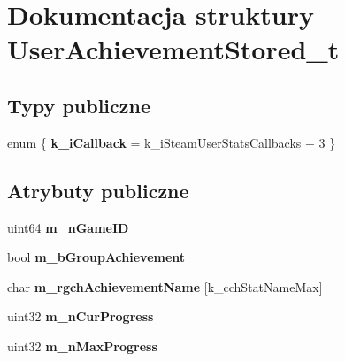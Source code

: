 \hypertarget{struct_user_achievement_stored__t}{}\section{Dokumentacja struktury User\+Achievement\+Stored\+\_\+t}
\label{struct_user_achievement_stored__t}
\subsection*{Typy publiczne}
\begin{DoxyCompactItemize}
\item 
\mbox{\label{struct_user_achievement_stored__t_a65743d3117422d2445c2b53546133399}} 
enum \{ {\bfseries k\+\_\+i\+Callback} = k\+\_\+i\+Steam\+User\+Stats\+Callbacks + 3
 \}
\end{DoxyCompactItemize}
\subsection*{Atrybuty publiczne}
\begin{DoxyCompactItemize}
\item 
\mbox{\label{struct_user_achievement_stored__t_a5ab451c730543139cd247f312a6fbc1f}} 
uint64 {\bfseries m\+\_\+n\+Game\+ID}
\item 
\mbox{\label{struct_user_achievement_stored__t_a6f827a81ebfa66b0ca09496c96edbeeb}} 
bool {\bfseries m\+\_\+b\+Group\+Achievement}
\item 
\mbox{\label{struct_user_achievement_stored__t_acaa3e757c67143c8d7c4b99bc39c07ed}} 
char {\bfseries m\+\_\+rgch\+Achievement\+Name} \mbox{[}k\+\_\+cch\+Stat\+Name\+Max\mbox{]}
\item 
\mbox{\label{struct_user_achievement_stored__t_a87b87f60deb9d9882bd3f31238a5cb74}} 
uint32 {\bfseries m\+\_\+n\+Cur\+Progress}
\item 
\mbox{\label{struct_user_achievement_stored__t_a49c36b1b6c8bad694e8fd4248a93a75c}} 
uint32 {\bfseries m\+\_\+n\+Max\+Progress}
\end{DoxyCompactItemize}


